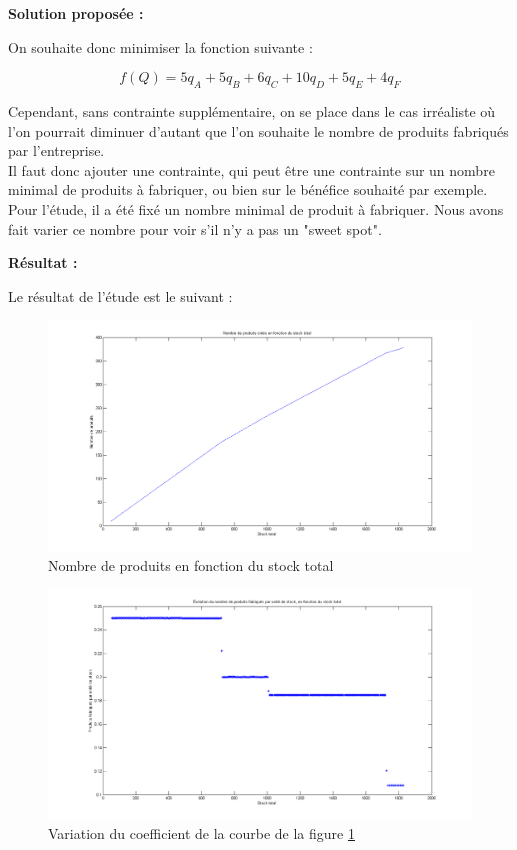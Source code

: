 \documentclass[paper=a4, fontsize=11pt]{report}
\numberwithin{equation}{section}		%
\numberwithin{figure}{section}			%
\numberwithin{table}{section}				%
\renewcommand{\bf}[1]{\textbf{#1}}
\begin{document}
\bf{Solution proposée :}

On souhaite donc minimiser la fonction suivante : 

\[ f(Q) = 5q_A + 5q_B + 6q_C + 10q_D + 5q_E + 4q_F \]

Cependant, sans contrainte supplémentaire, on se place dans le cas irréaliste où l'on pourrait diminuer d'autant que l'on souhaite le nombre de produits fabriqués par l'entreprise.\\
Il faut donc ajouter une contrainte, qui peut être une contrainte sur un nombre minimal de produits à fabriquer, ou bien sur le bénéfice souhaité par exemple.\\
Pour l'étude, il a été fixé un nombre minimal de produit à fabriquer. Nous avons fait varier ce nombre pour voir s'il n'y a pas un "sweet spot".

\bf{Résultat :}

Le résultat de l'étude est le suivant : 

\begin{figure}[H]
\caption{Nombre de produits en fonction du stock total \label{figstock}}
\centering
\includegraphics[width=16cm]{figures/nbProduitsFctStockTotal.png}
\end{figure}

\begin{figure}[H]
\caption{Variation du coefficient de la courbe de la figure \ref{figstock}}
\centering
\includegraphics[width=16cm]{figures/nbProduitsFctStockTotal_Coeff.png}
\end{figure}
\end{document}
